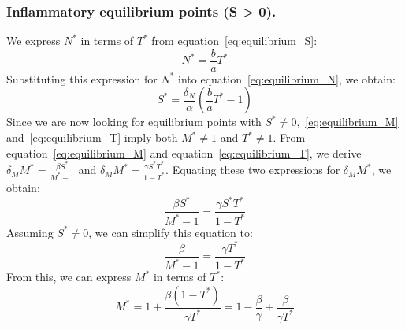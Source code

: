 \documentclass[a4paper, 12pt]{article}
\begin{document}
\subsubsection{Inflammatory equilibrium points (S > 0).}\label{sec:inflammatory_equilibria}
We express $N^*$ in terms of $T^*$ from equation~\eqref{eq:equilibrium_S}:
\begin{equation}
N^* = \frac{b}{a} T^*
\label{eq:N_in_terms_of_T}
\end{equation}
Substituting this expression for $N^*$ into equation~\eqref{eq:equilibrium_N}, we obtain:
\begin{equation}
S^* = \frac{\delta_N}{\alpha} \left(\frac{b}{a} T^* - 1\right)
\label{eq:S_in_terms_of_T}
\end{equation}
Since we are now looking for equilibrium points with $S^* \neq 0$,~\eqref{eq:equilibrium_M} and~\eqref{eq:equilibrium_T} imply both $M^* \neq 1$ and $T^* \neq 1$.
From equation~\eqref{eq:equilibrium_M} and equation~\eqref{eq:equilibrium_T}, 
we derive  $\delta_M M^* = \frac{\beta S^*}{M^* - 1}$ and $\delta_M M^* = \frac{\gamma S^* T^*}{1 - T^*}$.
Equating these two expressions for $\delta_M M^*$, we obtain:
\[\frac{\beta S^*}{M^* - 1} = \frac{\gamma S^* T^*}{1 - T^*}
\]
Assuming $S^* \neq 0$, we can simplify this equation to:
\[\frac{\beta}{M^* - 1} = \frac{\gamma T^*}{1 - T^*}
\]
From this, we can express $M^*$ in terms of $T^*$:
\begin{equation}
M^* = 1 + \frac{\beta (1 - T^*)}{\gamma T^*} = 1 - \frac{\beta}{\gamma} + \frac{\beta}{\gamma T^*}
\label{eq:M_in_terms_of_T}
\end{equation}  
\end{document}
